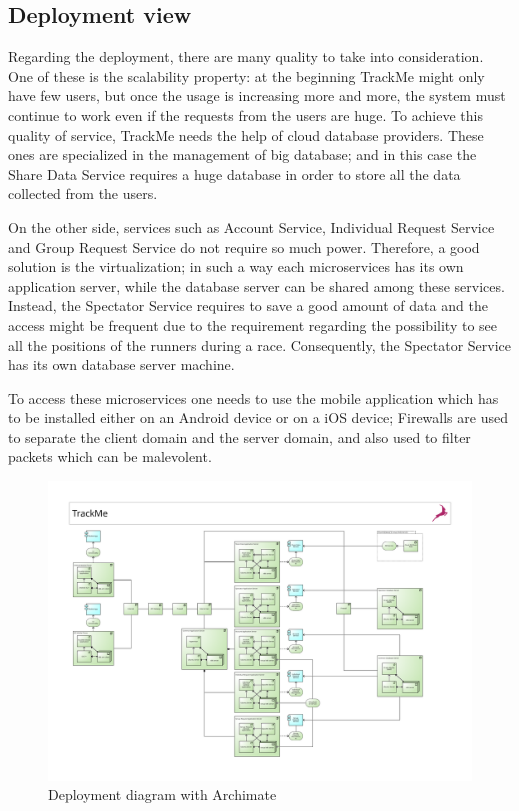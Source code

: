 \subsection{Deployment view}
\par
Regarding the deployment, there are many quality to take into consideration. One of these is the scalability property: at the beginning 
TrackMe might only have few users, but once the usage is increasing more and more, the system must continue to work even if the 
requests from the users are huge. To achieve this quality of service, TrackMe needs the help of cloud database providers. These ones 
are specialized in the management of big database; and in this case the Share Data Service requires a huge database in order to store 
all the data collected from the users. 
\par
On the other side, services such as Account Service, Individual Request Service and Group Request Service do not require so much 
power. Therefore, a good solution is the virtualization; in such a way each microservices has its own application server, while 
the database server can be shared among these services. Instead, the Spectator Service requires to save a good amount of data and 
the access might be frequent due to the requirement regarding the possibility to see all the positions of the runners during a race. 
Consequently, the Spectator Service has its own database server machine.
\par
To access these microservices one needs to use the mobile application which has to be installed either on an Android device or on a iOS 
device; Firewalls are used to separate the client domain and the server domain, and also used to filter packets which can be malevolent.
\begin{figure}[H]
\includegraphics[width=\linewidth]{Images/deploymentdiagram.pdf}
\caption{ Deployment diagram with Archimate }
\label{fig:deployment}
\end{figure}
